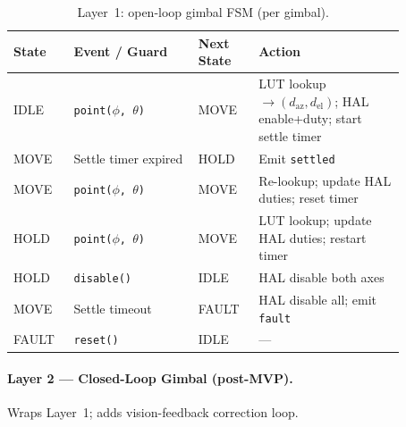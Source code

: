 \documentclass[12pt]{extarticle}
\begin{document}
\begin{table}[H]
\small\centering
\begin{tabular}{>{\raggedright}p{0.13\linewidth}
                >{\raggedright}p{0.28\linewidth}
                >{\raggedright}p{0.13\linewidth}
                >{\raggedright\arraybackslash}p{0.33\linewidth}}
\toprule
\textbf{State} & \textbf{Event / Guard} & \textbf{Next State} & \textbf{Action} \\
\midrule
IDLE  & \texttt{point($\phi$, $\theta$)} & MOVE  & LUT lookup $\to (d_\text{az}, d_\text{el})$; HAL enable+duty; start settle timer \\
MOVE  & Settle timer expired             & HOLD  & Emit \texttt{settled} \\
MOVE  & \texttt{point($\phi$, $\theta$)} & MOVE  & Re-lookup; update HAL duties; reset timer \\
HOLD  & \texttt{point($\phi$, $\theta$)} & MOVE  & LUT lookup; update HAL duties; restart timer \\
HOLD  & \texttt{disable()}               & IDLE  & HAL disable both axes \\
MOVE  & Settle timeout                   & FAULT & HAL disable all; emit \texttt{fault} \\
FAULT & \texttt{reset()}                 & IDLE  & --- \\
\bottomrule
\end{tabular}
\caption{Layer~1: open-loop gimbal FSM (per gimbal).}
\label{tab:fsm-ol-gimbal}
\end{table}

\paragraph{Layer 2 --- Closed-Loop Gimbal (post-MVP).}
Wraps Layer~1; adds vision-feedback correction loop.
\end{document}
